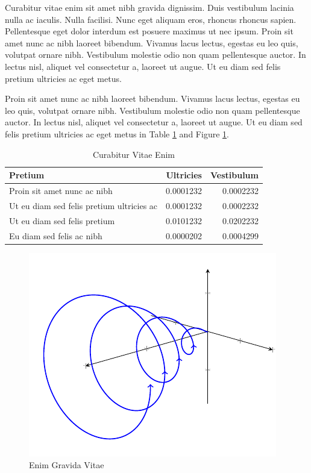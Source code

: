 Curabitur vitae enim sit amet nibh gravida dignissim. Duis vestibulum lacinia nulla ac iaculis. Nulla facilisi. Nunc eget aliquam eros, rhoncus rhoncus sapien. Pellentesque eget dolor interdum est posuere maximus ut nec ipsum. Proin sit amet nunc ac nibh laoreet bibendum. Vivamus lacus lectus, egestas eu leo quis, volutpat ornare nibh. Vestibulum molestie odio non quam pellentesque auctor. In lectus nisl, aliquet vel consectetur a, laoreet ut augue. Ut eu diam sed felis pretium ultricies ac eget metus.

Proin sit amet nunc ac nibh laoreet bibendum. Vivamus lacus lectus, egestas eu leo quis, volutpat ornare nibh. Vestibulum molestie odio non quam pellentesque auctor. In lectus nisl, aliquet vel consectetur a, laoreet ut augue. Ut eu diam sed felis pretium ultricies ac eget metus in Table \ref{table:small_number} and Figure \ref{fig:curve}.


\begin{table}
\centering
\begin{tabular}{lrr}
\hline
Pretium  & 	Ultricies & Vestibulum\\
\hline
Proin sit amet nunc ac nibh & 0.0001232 & 0.0002232\\
Ut eu diam sed felis pretium ultricies ac & 0.0001232 & 0.0002232\\
Ut eu diam sed felis pretium  & 0.0101232 & 0.0202232\\
Eu diam sed felis ac nibh & 0.0000202 & 0.0004299\\
\hline
\end{tabular}
\caption{Curabitur Vitae Enim}
\label{table:small_number}
\end{table}


\begin{figure}
\centering
\includegraphics{picture.pdf}
\caption{Enim Gravida Vitae }	
\label{fig:curve}
\end{figure}

